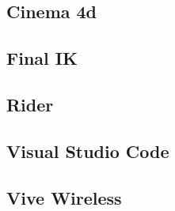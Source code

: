 \subsection{Cinema 4d}
\lipsum[5-12]

\subsection{Final IK}
\lipsum[5-12]

\subsection{Rider}
\lipsum[5-12]

\subsection{Visual Studio Code}
\lipsum[5-12]

\subsection{Vive Wireless}
\lipsum[5-12]
